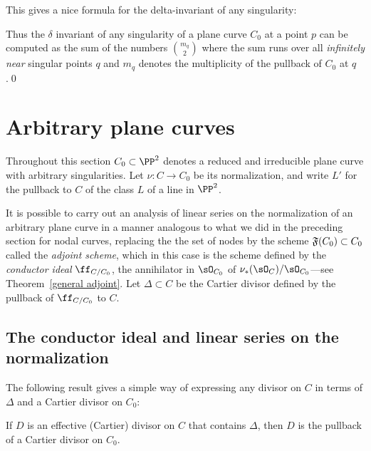 This gives a nice formula for the delta-invariant of any singularity:

\begin{corollary}
\label{computing delta}

Thus the $\delta$ invariant of any singularity of a plane curve $C_{0}$ at a point $p$ can be computed as the sum of the numbers $\binom{m_{q}}{2}$
where the sum runs over all \emph{infinitely near} singular points $q$ and $m_{q}$
denotes the multiplicity of the pullback of $C_{0}$ at $q$.\qed
\end{corollary}

\section{Arbitrary plane curves} \label{arbitrary plane curves}

Throughout this section $C_0 \subset \PP^2$ denotes a reduced and irreducible plane curve with arbitrary singularities. Let $\nu : C \to C_0$ be its normalization, and write $L'$ for the pullback to $C$ of the class $L$ of a line in $\PP^{2}$.

It is possible to carry out an analysis of linear series on the normalization of an arbitrary plane curve in a manner  analogous to what we did in the preceding section for nodal curves, replacing the the set of nodes by the scheme $\adj(C_{0})\subset C_{0}$ called the \emph{adjoint scheme}, which in this case is the scheme
defined by the \emph{conductor ideal} $\ff_{C/C_0}$, the annihilator in $\sO_{C_{0}}$ of $\nu_{*}(\sO_{C})/\sO_{C_{0}}$---see Theorem~\ref{general adjoint}. Let $\Delta\subset C$ be the Cartier divisor
defined by the pullback of $\ff_{C/C_0}$ to $C$.

\subsection{The conductor ideal and linear series on the normalization}\label{why add Delta}

The following result gives a simple way of expressing any divisor on $C$ in terms of $\Delta$ and a
Cartier divisor on $C_{0}$:

\begin{theorem}\label{Cartier on C}
If $D$ is an effective (Cartier) divisor on $C$ that contains $\Delta$, then $D$ is the pullback of a Cartier divisor on $C_{0}$. 
\end{theorem}

